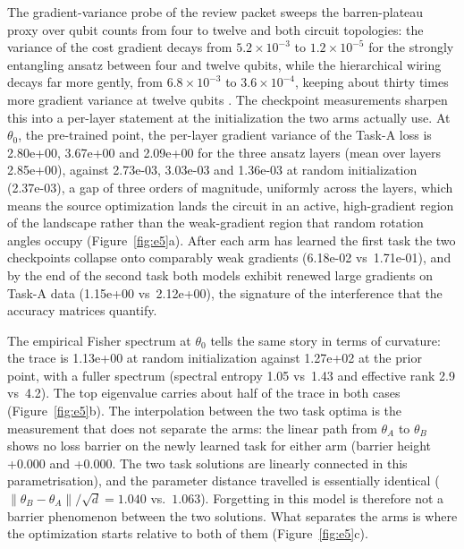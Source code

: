 \documentclass[preprint,number,sort&compress]{elsarticle}
\begin{document}
The gradient-variance probe of the review packet sweeps the barren-plateau
proxy over qubit counts from four to twelve and both circuit topologies:
the variance of the cost gradient decays from $5.2\times10^{-3}$ to
$1.2\times10^{-5}$ for the strongly entangling ansatz between four and
twelve qubits, while the hierarchical wiring decays far more gently, from
$6.8\times10^{-3}$ to $3.6\times10^{-4}$, keeping about thirty times
more gradient variance at twelve qubits
\cite{mcclean2018barren,pesah2021absence}. The checkpoint measurements
sharpen this into a per-layer statement at the initialization the two arms
actually use. At $\theta_0$, the pre-trained point, the per-layer gradient
variance of the Task-A loss is
2.80e+00, 3.67e+00
and 2.09e+00 for the three ansatz layers
(mean over layers 2.85e+00), against
2.73e-03, 3.03e-03
and 1.36e-03 at random initialization
(2.37e-03), a gap of three orders of magnitude,
uniformly across the layers, which means the source optimization lands the
circuit in an active, high-gradient region of the landscape rather than the
weak-gradient region that random rotation angles occupy
(Figure~\ref{fig:e5}a). After each arm has learned the first task the two
checkpoints collapse onto comparably weak gradients
(6.18e-02 vs\ 1.71e-01), and by the end
of the second task both models exhibit renewed large gradients on Task-A
data (1.15e+00 vs\ 2.12e+00), the
signature of the interference that the accuracy matrices quantify.

The empirical Fisher spectrum at $\theta_0$ tells the same story in terms
of curvature: the trace is 1.13e+00 at random
initialization against 1.27e+02 at the prior
point, with a fuller spectrum (spectral entropy
1.05 vs\ 1.43
and effective rank 2.9 vs\ 4.2). The top eigenvalue carries about half of the trace in both cases
(Figure~\ref{fig:e5}b). The interpolation between the two task optima
is the measurement that does not separate the arms: the linear path from
$\theta_A$ to $\theta_B$ shows no loss barrier on the newly learned task
for either arm (barrier height +0.000 and
+0.000. The two task solutions are linearly
connected in this parametrisation), and the parameter distance travelled
is essentially identical
($\|\theta_B-\theta_A\|/\sqrt{d} = 1.040$ vs.\ $1.063$).
Forgetting in this model is therefore not a barrier phenomenon between the
two solutions. What separates the arms is where the optimization starts
relative to both of them (Figure~\ref{fig:e5}c).
\end{document}
